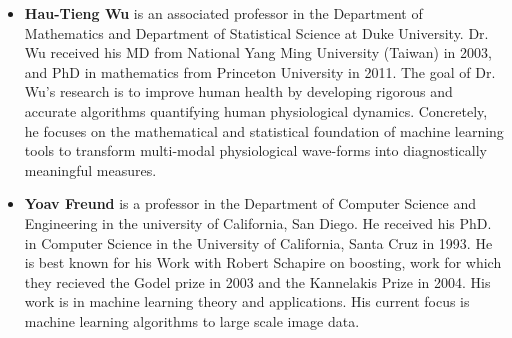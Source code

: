 \begin{itemize}
\item {\bf Hau-Tieng Wu} is an associated professor in the Department
  of Mathematics and Department of Statistical Science at Duke
  University. Dr. Wu received his MD from National Yang Ming
  University (Taiwan) in 2003, and PhD in mathematics from Princeton
  University in 2011. The goal of Dr. Wu's research is to improve
  human health by developing rigorous and accurate algorithms
  quantifying human physiological dynamics.  Concretely, he focuses on
  the mathematical and statistical foundation of machine learning
  tools to transform multi-modal physiological wave-forms into
  diagnostically meaningful measures.
\item {\bf Yoav Freund} is a professor in the Department of Computer
  Science and Engineering in the university of California, San
  Diego. He received his PhD. in Computer Science in the University of
  California, Santa Cruz in 1993. He is best known for his Work with
  Robert Schapire on boosting, work for which they recieved the Godel
  prize in 2003 and the Kannelakis Prize in 2004.  His work is in
  machine learning theory and applications. His current focus is
  machine learning algorithms to large scale image data.
\end{itemize}